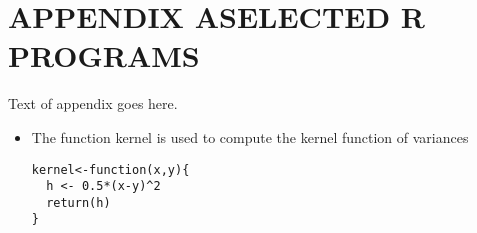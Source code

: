 \chapter{\texorpdfstring{APPENDIX A\hspace{1em}SELECTED R PROGRAMS}{APPENDIX A}}

Text of appendix goes here.

\begin{itemize}
\item The function kernel is used to compute the kernel function of variances
{\small
\begin{lstlisting}
kernel<-function(x,y){
  h <- 0.5*(x-y)^2
  return(h)
}
\end{lstlisting}
}
\end{itemize}
